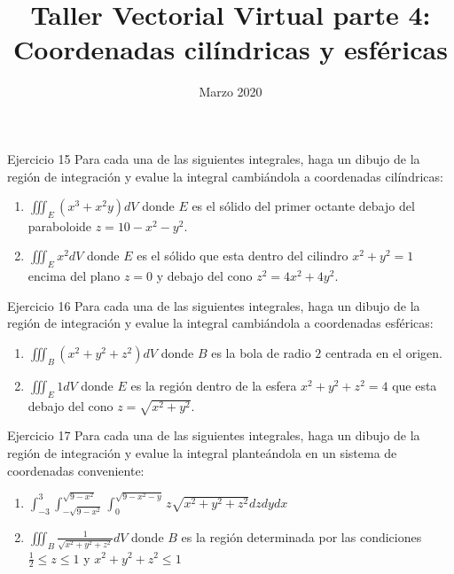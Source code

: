 \documentclass[usepdftitle=false]{beamer}
\title[]{Taller Vectorial Virtual parte 4: Coordenadas cil\'indricas y esf\'ericas}
\date{Marzo 2020}
\begin{document}
\begin{frame}
  \titlepage
\end{frame}

\begin{frame}{Ejercicio 15}
Para cada una de las siguientes integrales, haga un dibujo de la regi\'on de integraci\'on y evalue la integral cambi\'andola a coordenadas cil\'indricas:
\begin{enumerate}
\item $\iiint_E(x^3+x^2y)dV$ donde $E$ es el s\'olido del primer octante debajo del paraboloide $z=10-x^2-y^2$. 
\item $\iiint_E x^2dV$ donde $E$ es el s\'olido que esta dentro del cilindro $x^2+y^2=1$ encima del plano $z=0$ y debajo del cono $z^2=4x^2+4y^2$.

\end{enumerate}
\end{frame}


\begin{frame}{Ejercicio 16}
Para cada una de las siguientes integrales, haga un dibujo de la regi\'on de integraci\'on y evalue la integral cambi\'andola a coordenadas esf\'ericas:
\begin{enumerate}
\item $\iiint_B(x^2+y^2+z^2)dV$ donde $B$ es la bola de radio $2$ centrada en el origen. 
\item $\iiint_E 1dV$ donde $E$ es la regi\'on dentro de la esfera $x^2+y^2+z^2=4$ que esta debajo del cono $z=\sqrt{x^2+y^2}$.

\end{enumerate}
\end{frame}



\begin{frame}{Ejercicio 17}
Para cada una de las siguientes integrales, haga un dibujo de la regi\'on de integraci\'on y evalue la integral plante\'andola en un sistema de coordenadas conveniente:
\begin{enumerate}
\item $\int_{-3}^3\int_{-\sqrt{9-x^2}}^{\sqrt{9-x^2}}\int_0^{\sqrt{9-x^2-y}}z\sqrt{x^2+y^2+z^2}dzdydx$

\item $\iiint_B\frac{1}{\sqrt{x^2+y^2+z^2}}dV$ donde $B$ es la regi\'on determinada por las condiciones $\frac{1}{2}\leq z\leq 1$ y $x^2+y^2+z^2\leq 1$
\end{enumerate}
\end{frame}
\end{document}
